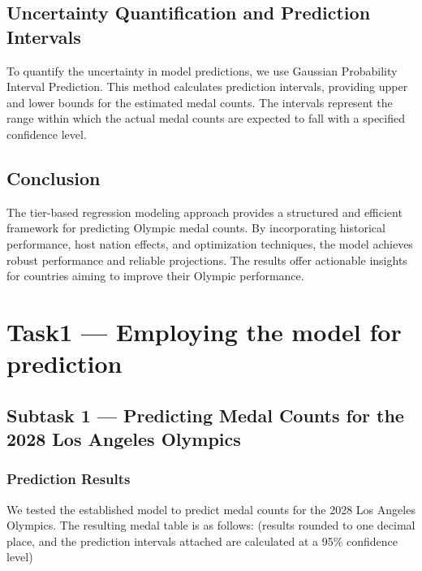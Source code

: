 \documentclass{mcmthesis}
\begin{document}
\subsection{Uncertainty Quantification and Prediction Intervals}

To quantify the uncertainty in model predictions, we use Gaussian Probability Interval Prediction. This method calculates prediction intervals, providing upper and lower bounds for the estimated medal counts. The intervals represent the range within which the actual medal counts are expected to fall with a specified confidence level.


\subsection{Conclusion}

The tier-based regression modeling approach provides a structured and efficient framework for predicting Olympic medal counts. By incorporating historical performance, host nation effects, and optimization techniques, the model achieves robust performance and reliable projections. The results offer actionable insights for countries aiming to improve their Olympic performance.

\section{Task1 --- Employing the model for prediction}

\subsection{Subtask 1 --- Predicting Medal Counts for the 2028 Los Angeles Olympics}

\subsubsection{Prediction Results}
We tested the established model to predict medal counts for the 2028 Los Angeles Olympics. The resulting medal table is as follows: (results rounded to one decimal place, and the prediction intervals attached are calculated at a 95\% confidence level)
\end{document}
